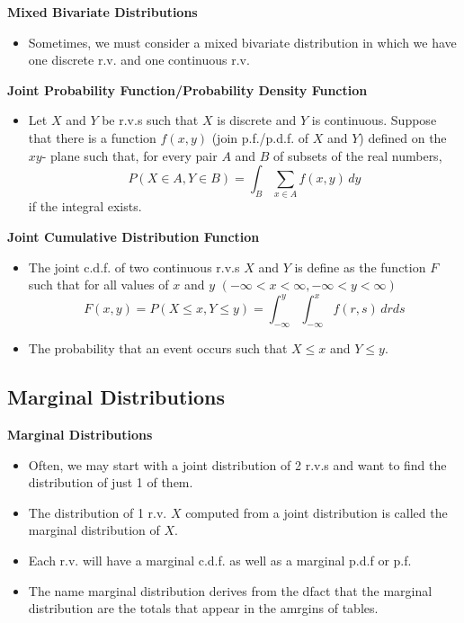 \documentclass[11pt]{article}
\begin{document}
\textbf{Mixed Bivariate Distributions}\
\begin{itemize}
    \item Sometimes, we must consider a mixed bivariate distribution in which we have one 
    discrete r.v. and one continuous r.v.
\end{itemize}

\textbf{Joint Probability Function/Probability Density Function}
\begin{itemize}
    \item Let $X$ and $Y$ be r.v.s such that $X$ is discrete and $Y$ is continuous. Suppose 
    that there is a function $f(x,y)$ (join p.f./p.d.f. of $X$ and $Y$) defined on the $xy$-
    plane such that, for every pair $A$ and $B$ of subsets of the real numbers,
    \[P(X \in A, Y \in B) = \int_B \sum_{x \in A} f(x,y) \,dy\]
    if the integral exists.
\end{itemize}

\textbf{Joint Cumulative Distribution Function}
\begin{itemize}
    \item The joint c.d.f. of two continuous r.v.s $X$ and $Y$ is define as the function $F$ such 
    that for all values of $x$ and $y$ $(-\infty < x < \infty, -\infty < y < \infty)$ 
    \[F(x,y)=P(X \le x, Y \le y) = \int_{-\infty}^{y} \int_{-\infty}^{x} f(r,s) \,drds\]
    \item The probability that an event occurs such that $X \le x$ and $Y \le y$.
\end{itemize}

\subsection{Marginal Distributions}

\textbf{Marginal Distributions}
\begin{itemize}
    \item Often, we may start with a joint distribution of 2 r.v.s and want to find the 
    distribution of just 1 of them.
    \item The distribution of 1 r.v. $X$ computed from a joint distribution is called the 
    marginal distribution of $X$. 
    \item Each r.v. will have a marginal c.d.f. as well as a marginal p.d.f or p.f.
    \item The name marginal distribution derives from the dfact that the marginal distribution
    are the totals that appear in the amrgins of tables. 
\end{itemize}
\end{document}

